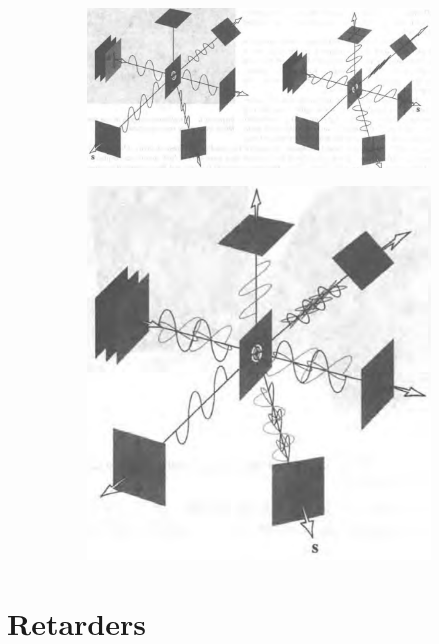 \begin{figure}[H]
  \centering
  \begin{subfigure}{.55\textwidth}
    \centering
    \includegraphics[width=\linewidth]{figures/Scattering-Polarization-1}
  \end{subfigure}
  \begin{subfigure}{.3\textwidth}
    \centering
    \includegraphics[width=0.9\linewidth]{figures/Scattering-Polarization-2}
  \end{subfigure}
\end{figure}

\section{Retarders}

